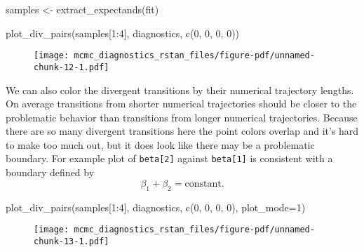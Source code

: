 \documentclass[
  letterpaper,
  DIV=11,
  numbers=noendperiod]{scrartcl}
\newenvironment{Shaded}{\begin{snugshade}}{\end{snugshade}}
\newcommand{\AttributeTok}[1]{\textcolor[rgb]{0.40,0.45,0.13}{#1}}
\newcommand{\DecValTok}[1]{\textcolor[rgb]{0.68,0.00,0.00}{#1}}
\newcommand{\FunctionTok}[1]{\textcolor[rgb]{0.28,0.35,0.67}{#1}}
\newcommand{\NormalTok}[1]{\textcolor[rgb]{0.00,0.23,0.31}{#1}}
\newcommand{\OtherTok}[1]{\textcolor[rgb]{0.00,0.23,0.31}{#1}}
\newcommand{\SpecialCharTok}[1]{\textcolor[rgb]{0.37,0.37,0.37}{#1}}
\begin{document}
\begin{Shaded}
\begin{Highlighting}[]
\NormalTok{samples }\OtherTok{\textless{}{-}} \FunctionTok{extract\_expectands}\NormalTok{(fit)}

\FunctionTok{plot\_div\_pairs}\NormalTok{(samples[}\DecValTok{1}\SpecialCharTok{:}\DecValTok{4}\NormalTok{], diagnostics, }\FunctionTok{c}\NormalTok{(}\DecValTok{0}\NormalTok{, }\DecValTok{0}\NormalTok{, }\DecValTok{0}\NormalTok{, }\DecValTok{0}\NormalTok{))}
\end{Highlighting}
\end{Shaded}

\begin{figure}[H]

{\centering \texttt{[image: mcmc\_diagnostics\_rstan\_files/figure-pdf/unnamed-chunk-12-1.pdf]}

}

\end{figure}

We can also color the divergent transitions by their numerical
trajectory lengths. On average transitions from shorter numerical
trajectories should be closer to the problematic behavior than
transitions from longer numerical trajectories. Because there are so
many divergent transitions here the point colors overlap and it's hard
to make too much out, but it does look like there may be a problematic
boundary. For example plot of \texttt{beta{[}2{]}} against
\texttt{beta{[}1{]}} is consistent with a boundary defined by \[
\beta_{1} + \beta_{2} = \mathrm{constant}.
\]

\begin{Shaded}
\begin{Highlighting}[]
\FunctionTok{plot\_div\_pairs}\NormalTok{(samples[}\DecValTok{1}\SpecialCharTok{:}\DecValTok{4}\NormalTok{], diagnostics, }\FunctionTok{c}\NormalTok{(}\DecValTok{0}\NormalTok{, }\DecValTok{0}\NormalTok{, }\DecValTok{0}\NormalTok{, }\DecValTok{0}\NormalTok{), }\AttributeTok{plot\_mode=}\DecValTok{1}\NormalTok{)}
\end{Highlighting}
\end{Shaded}

\begin{figure}[H]

{\centering \texttt{[image: mcmc\_diagnostics\_rstan\_files/figure-pdf/unnamed-chunk-13-1.pdf]}

}

\end{figure}
\end{document}
